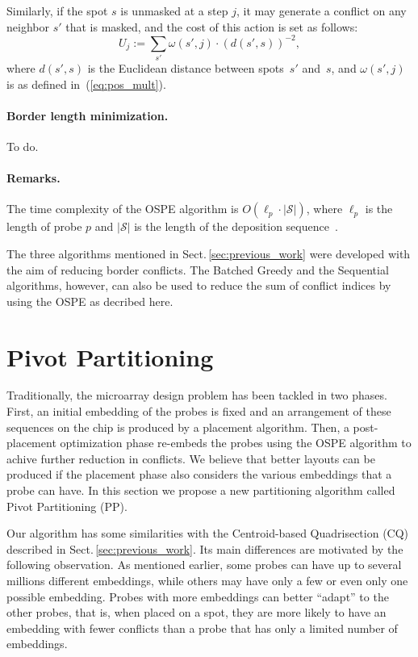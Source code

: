 \documentclass[runningheads]{llncs}
\begin{document}
Similarly, if the spot $s$ is unmasked at a step $j$, it may generate a conflict
on any neighbor $s'$ that is masked, and the cost of this action is set as follows:
\begin{equation}
U_{j} := \sum_{s'} \omega(s',j) \cdot (d(s',s))^{-2},
\end{equation}
where $d(s',s)$ is the Euclidean distance between spots~$s'$ and~$s$, and
$\omega(s',j)$ is as defined in~(\ref{eq:pos_mult}).

\paragraph{Border length minimization.} To do.

\paragraph{Remarks.}
The time complexity of the OSPE algorithm is $O(\ell_p \cdot |\mathcal{S}|)$,
where $\ell_p$ is the length of probe $p$ and $|\mathcal{S}|$ is the length of
the deposition sequence~\cite{KAHNG02}.

The three algorithms mentioned in Sect.\,\ref{sec:previous_work} were developed with
the aim of reducing border conflicts. The Batched Greedy and the Sequential algorithms,
however, can also be used to reduce the sum of conflict indices by using the OSPE as
decribed here.

\section{Pivot Partitioning}
\label{sec:pivotpart}

Traditionally, the microarray design problem has been tackled in two phases. First,
an initial embedding of the probes is fixed and an arrangement of these sequences
on the chip is produced by a placement algorithm. Then, a post-placement optimization
phase re-embeds the probes using the OSPE algorithm to achive further reduction in
conflicts. We believe that better layouts can be produced if the placement phase
also considers
the various embeddings that a probe can have. In this section we propose a new
partitioning algorithm called Pivot Partitioning (PP).

Our algorithm
has some similarities with the Centroid-based Quadrisection (CQ) described
in Sect.\,\ref{sec:previous_work}.
Its main differences are motivated by the following observation.
As mentioned earlier, some probes can have up to several millions different
embeddings, while others may have only a few or even only one possible embedding.
Probes with more embeddings can better
``adapt'' to the other probes, that is, when placed on a spot, they are more likely
to have an embedding with fewer conflicts than a probe that has
only a limited number of embeddings.
\end{document}
